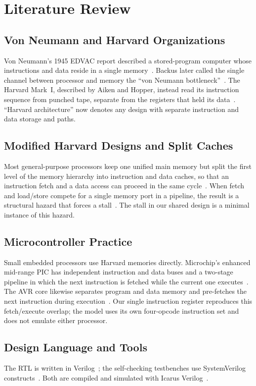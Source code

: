 \documentclass[conference,a4paper]{IEEEtran}
\begin{document}
\section{Literature Review}
\subsection{Von Neumann and Harvard Organizations}
Von Neumann's 1945 EDVAC report described a stored-program computer whose
instructions and data reside in a single memory~\cite{vonneumann}.
Backus later called the single channel between processor and memory the
``von Neumann bottleneck''~\cite{backus}. The Harvard Mark~I, described
by Aiken and Hopper, instead read its instruction sequence from punched
tape, separate from the registers that held its data~\cite{aiken}.
``Harvard architecture'' now denotes any design with separate instruction
and data storage and paths.

\subsection{Modified Harvard Designs and Split Caches}
Most general-purpose processors keep one unified main memory but split
the first level of the memory hierarchy into instruction and data caches,
so that an instruction fetch and a data access can proceed in the same
cycle~\cite{hp,smith}. When fetch and load/store compete for a single
memory port in a pipeline, the result is a structural hazard that forces
a stall~\cite{hp}. The stall in our shared design is a minimal instance
of this hazard.

\subsection{Microcontroller Practice}
Small embedded processors use Harvard memories directly. Microchip's
enhanced mid-range PIC has independent instruction and data buses and a
two-stage pipeline in which the next instruction is fetched while the
current one executes~\cite{pic}. The AVR core likewise separates program
and data memory and pre-fetches the next instruction during
execution~\cite{avr}. Our single instruction register reproduces this
fetch/execute overlap; the model uses its own four-opcode instruction set
and does not emulate either processor.

\subsection{Design Language and Tools}
The RTL is written in Verilog~\cite{ieee1364}; the self-checking
testbenches use SystemVerilog constructs~\cite{ieee1800}. Both are
compiled and simulated with Icarus Verilog~\cite{icarus}.
\end{document}
